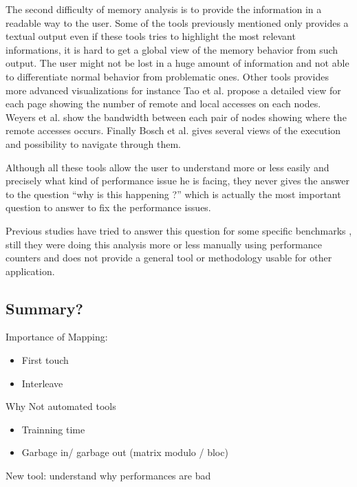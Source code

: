 The second difficulty of memory analysis is to provide the information in a
readable way to the user. Some of the tools previously mentioned only provides
a textual output \cite{Lachaize12MemProf,McCurdy2010} even if these tools
tries to highlight the most relevant informations, it is hard to get a global
view of the memory behavior from such output. The user might not be lost in a
huge amount of information and not able to differentiate normal behavior from
problematic ones. Other tools provides more advanced visualizations for
instance Tao et al. \cite{Tao01Visualizing} propose a detailed view for each
page showing the number of remote and local accesses on each nodes. Weyers et
al. \cite{Weyers14Visualization} show the bandwidth between each pair of nodes
showing where the remote accesses occurs. Finally Bosch et al.
\cite{Bosch00Rivet} gives several views of the execution and possibility to
navigate through them.

Although all these tools allow the user to understand more or less easily and
precisely what kind of performance issue he is facing, they never gives the
answer to the question ``why is this happening ?'' which is actually the most
important question to answer to fix the performance issues.

Previous studies have tried to answer this question for some specific
benchmarks \cite{Majo13(Mis)understanding,Jiang14Understanding}, still they
were doing this analysis more or less manually using performance counters and
does not provide a general tool or methodology usable for other application.

\subsection{Summary?}

Importance of Mapping:
\begin{itemize}
    \item First touch
    \item Interleave
\end{itemize}

Why Not automated tools
\begin{itemize}
    \item Trainning time
    \item Garbage in/ garbage out (matrix modulo / bloc)
\end{itemize}

New tool: understand why performances are bad
